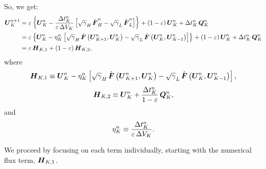 So, we get:
\begin{align}
    \boldsymbol{U}^{n+1}_{K}&=\varepsilon\left\{\boldsymbol{U}^{n}_{K}-\frac{\Delta t^{n}_{K}}{\varepsilon\,\Delta V_{K}}\left[\sqrt{\gamma}_{H}\,\hat{\boldsymbol{F}}^{n}_{H}-\sqrt{\gamma}_{L}\,\hat{\boldsymbol{F}}^{n}_{L}\right]\right\}+\left(1-\varepsilon\right)\boldsymbol{U}^{n}_{K}+\Delta t^{n}_{K}\,\boldsymbol{Q}^{n}_{K}\\
    &=\varepsilon\left\{\boldsymbol{U}^{n}_{K}-\eta^{n}_{K}\left[\sqrt{\gamma}_{H}\,\hat{\boldsymbol{F}}\left(\boldsymbol{U}^{n}_{K+1},\boldsymbol{U}^{n}_{K}\right)-\sqrt{\gamma}_{L}\,\hat{\boldsymbol{F}}\left(\boldsymbol{U}^{n}_{K},\boldsymbol{U}^{n}_{K-1}\right)\right]\right\}+\left(1-\varepsilon\right)\boldsymbol{U}^{n}_{K}+\Delta t^{n}_{K}\,\boldsymbol{Q}^{n}_{K}\\
    &=\varepsilon\,\boldsymbol{H}_{K,1}+\left(1-\varepsilon\right)\boldsymbol{H}_{K,2},
\end{align}
where
\begin{equation}
    \boldsymbol{H}_{K,1}\equiv \boldsymbol{U}^{n}_{K}-\eta^{n}_{K}\left[\sqrt{\gamma}_{H}\,\hat{\boldsymbol{F}}\left(\boldsymbol{U}^{n}_{K+1},\boldsymbol{U}^{n}_{K}\right)-\sqrt{\gamma}_{L}\,\hat{\boldsymbol{F}}\left(\boldsymbol{U}^{n}_{K},\boldsymbol{U}^{n}_{K-1}\right)\right],
\end{equation}
\begin{equation}
    \boldsymbol{H}_{K,2}\equiv\boldsymbol{U}^{n}_{K}+\frac{\Delta t^{n}_{K}}{1-\varepsilon}\,\boldsymbol{Q}^{n}_{K},
\end{equation}
and
\begin{equation}
    \eta^{n}_{K}\equiv\frac{\Delta t^{n}_{K}}{\varepsilon\,\Delta V_{K}}.
\end{equation}

We proceed by focusing on each term individually, starting with the numerical flux term, $\boldsymbol{H}_{K,1}$.

